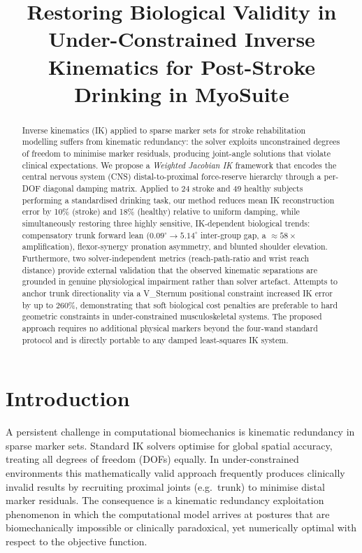 \documentclass[journal,10pt,twocolumn]{IEEEtran}
\title{Restoring Biological Validity in Under-Constrained Inverse Kinematics
       for Post-Stroke Drinking in MyoSuite}
\author{%
  \IEEEauthorblockN{Abdul Maajid Aga\IEEEauthorrefmark{1},
                    Shawgi Mounis\IEEEauthorrefmark{1}}
  \IEEEauthorblockA{\IEEEauthorrefmark{1}%
    Department of Engineering and Physical Sciences, Heriot-Watt University, Dubai, UAE\\
    Email: \{ama2024, S.Mounis\}@hw.ac.uk}
}
\begin{document}
\maketitle

\begin{abstract}
Inverse kinematics (IK) applied to sparse marker sets for stroke rehabilitation
modelling suffers from kinematic redundancy: the solver exploits unconstrained
degrees of freedom to minimise marker residuals, producing joint-angle solutions
that violate clinical expectations.
We propose a \textit{Weighted Jacobian IK} framework that encodes the central
nervous system (CNS) distal-to-proximal force-reserve hierarchy through a per-DOF
diagonal damping matrix.
Applied to 24 stroke and 49 healthy subjects performing a standardised drinking
task, our method reduces mean IK reconstruction error by 10\% (stroke) and 18\%
(healthy) relative to uniform damping, while simultaneously restoring three
highly sensitive, IK-dependent biological trends: compensatory trunk forward
lean ($0.09^{\circ} \to 5.14^{\circ}$ inter-group gap, a ${\approx}58\times$
amplification), flexor-synergy pronation asymmetry, and blunted shoulder
elevation. Furthermore, two solver-independent metrics (reach-path-ratio and
wrist reach distance) provide external validation that the
observed kinematic separations are grounded in genuine physiological impairment
rather than solver artefact.
Attempts to anchor trunk directionality via a V\_Sternum positional constraint
increased IK error by up to 260\%, demonstrating that soft biological cost
penalties are preferable to hard geometric constraints in under-constrained
musculoskeletal systems.
The proposed approach requires no additional physical markers beyond the
four-wand standard protocol and is directly portable to any damped
least-squares IK system.
\end{abstract}

\section{Introduction}

A persistent challenge in computational biomechanics is kinematic redundancy
in sparse marker sets. Standard IK solvers optimise for global spatial accuracy,
treating all degrees of freedom (DOFs) equally. In under-constrained environments
this mathematically valid approach frequently produces clinically invalid results
by recruiting proximal joints (e.g.\ trunk) to minimise distal marker residuals.
The consequence is a kinematic redundancy exploitation phenomenon in which
the computational model arrives at postures that are biomechanically impossible
or clinically paradoxical, yet numerically optimal with respect to the objective
function.
\end{document}
